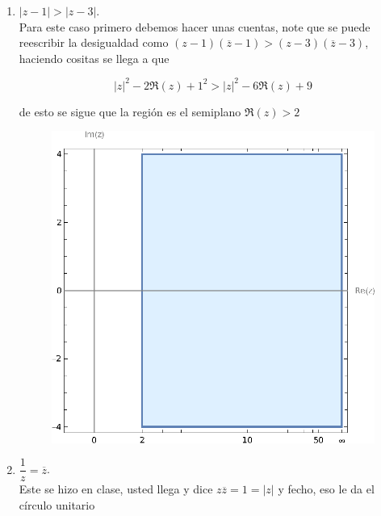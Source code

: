 \documentclass[11pt]{article}
\begin{document}
\begin{enumerate}
\begin{enumerate}
        \item $|z - 1| > |z - 3|$.\\

        Para este caso primero debemos hacer unas cuentas, note que se puede reescribir la desigualdad como $(z-1)(\overline{z}-1)>(z-3)(\overline{z}-3)$, haciendo cositas se llega a que

        $$|z|^2-2 \Re(z)+1^2>|z|^2-6 \Re(z)+9 $$

        de esto se sigue que la región es el semiplano $\Re(z)>2$

         \begin{figure}[H]
         \centering
         \includegraphics[scale=0.85]{Graphics/R2.eps}
         \end{figure} 

        \item $\dfrac{1}{z} = \overline{z}$.\\

        Este se hizo en clase, usted llega y dice $z \overline{z}=1=|z|$ y fecho, eso le da el círculo unitario\\


\end{enumerate}
\end{enumerate}
\end{document}
